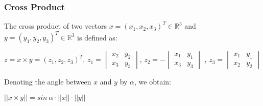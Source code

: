 \documentclass{article}
\begin{document}
\subsubsection{Cross Product}
The cross product of two vectors $x = (x_1, x_2, x_3)^T \in \mathbb{R}^3$ and $y = (y_1, y_2, y_3)^T \in \mathbb{R}^3$ is defined as:
\begin{center}
    $ z = x \times y = (z_1, z_2, z_3)^T $, $ z_1 =
    \begin{vmatrix}
        x_2 & y_2 \\
        x_3 & y_3
    \end{vmatrix}
    $, $ z_2 = - 
    \begin{vmatrix}
        x_1 & y_1 \\
        x_3 & y_3
    \end{vmatrix}
    $ , $ z_3 = 
    \begin{vmatrix}
        x_1 & y_1 \\
        x_2 & y_2
    \end{vmatrix}
    $
\end{center}
Denoting the angle between $ x $ and $ y $ by $ \alpha $, we obtain:
\begin{center}
    $ ||x \times y|| = sin \ \alpha \cdot ||x|| \cdot ||y|| $   
\end{center}
\end{document}
